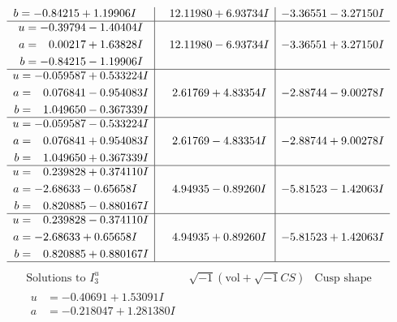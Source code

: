 \documentclass[1p]{elsarticle_modified}
\theoremstyle{definition}
\newcommand{\I}{\sqrt{-1}}
\begin{document}
$$\begin{array}{c|c|c}
\begin{aligned}
b &= -0.84215 + 1.19906 I\end{aligned}
 & \phantom{-}12.11980 + 6.93734 I & -3.36551 - 3.27150 I \\ \hline\begin{aligned}
u &= -0.39794 - 1.40404 I \\
a &= \phantom{-}0.00217 + 1.63828 I \\
b &= -0.84215 - 1.19906 I\end{aligned}
 & \phantom{-}12.11980 - 6.93734 I & -3.36551 + 3.27150 I \\ \hline\begin{aligned}
u &= -0.059587 + 0.533224 I \\
a &= \phantom{-}0.076841 - 0.954083 I \\
b &= \phantom{-}1.049650 - 0.367339 I\end{aligned}
 & \phantom{-}2.61769 + 4.83354 I & -2.88744 - 9.00278 I \\ \hline\begin{aligned}
u &= -0.059587 - 0.533224 I \\
a &= \phantom{-}0.076841 + 0.954083 I \\
b &= \phantom{-}1.049650 + 0.367339 I\end{aligned}
 & \phantom{-}2.61769 - 4.83354 I & -2.88744 + 9.00278 I \\ \hline\begin{aligned}
u &= \phantom{-}0.239828 + 0.374110 I \\
a &= -2.68633 - 0.65658 I \\
b &= \phantom{-}0.820885 - 0.880167 I\end{aligned}
 & \phantom{-}4.94935 - 0.89260 I & -5.81523 - 1.42063 I \\ \hline\begin{aligned}
u &= \phantom{-}0.239828 - 0.374110 I \\
a &= -2.68633 + 0.65658 I \\
b &= \phantom{-}0.820885 + 0.880167 I\end{aligned}
 & \phantom{-}4.94935 + 0.89260 I & -5.81523 + 1.42063 I\\
 \hline 
 \end{array}$$\newpage$$\begin{array}{c|c|c}  
\text{Solutions to }I^u_{3}& \I (\text{vol} + \sqrt{-1}CS) & \text{Cusp shape}\\
 \hline 
\begin{aligned}
u &= -0.40691 + 1.53091 I \\
a &= -0.218047 + 1.281380 I \\

\end{aligned}
\end{array}$$
\end{document}
